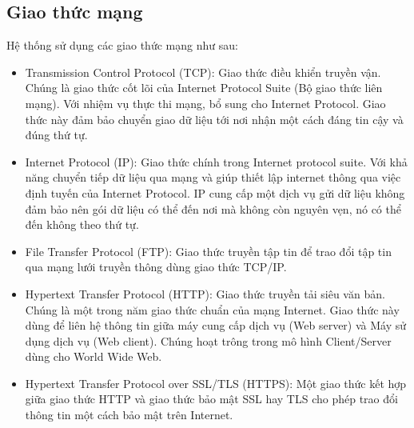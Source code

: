 \documentclass[a4paper, 12pt]{article}
\begin{document}
	\subsection{Giao thức mạng}
	Hệ thống sử dụng các giao thức mạng như sau:
	\begin{itemize}
		\item Transmission Control Protocol (TCP): Giao thức điều khiển truyền vận. Chúng là giao thức cốt lõi của Internet Protocol Suite (Bộ giao thức liên mạng). Với nhiệm vụ thực thi mạng, bổ sung cho Internet Protocol. Giao thức này đảm bảo chuyển giao dữ liệu tới nơi nhận một cách đáng tin cậy và đúng thứ tự.
		\item Internet Protocol (IP): Giao thức chính trong Internet protocol suite. Với khả năng chuyển tiếp dữ liệu qua mạng và giúp thiết lập internet thông qua việc định tuyến  của Internet Protocol. IP cung cấp một dịch vụ gửi dữ liệu không đảm bảo  nên gói dữ liệu có thể đến nơi mà không còn nguyên vẹn, nó có thể đến không theo thứ tự.
		\item File Transfer Protocol (FTP): Giao thức truyền tập tin để trao đổi tập tin qua mạng lưới truyền thông dùng giao thức TCP/IP.
		\item Hypertext Transfer Protocol (HTTP): Giao thức truyền tải siêu văn bản. Chúng là một trong năm giao thức chuẩn của mạng Internet. Giao thức này dùng để liên hệ thông tin giữa máy cung cấp dịch vụ (Web server) và Máy sử dụng dịch vụ (Web client). Chúng hoạt trông trong mô hình Client/Server dùng cho World Wide Web.
		\item Hypertext Transfer Protocol over SSL/TLS (HTTPS): Một giao thức kết hợp giữa giao thức HTTP và giao thức bảo mật SSL hay TLS cho phép trao đổi thông tin một cách bảo mật trên Internet.
	\end{itemize}
	\clearpage
	
\end{document}
